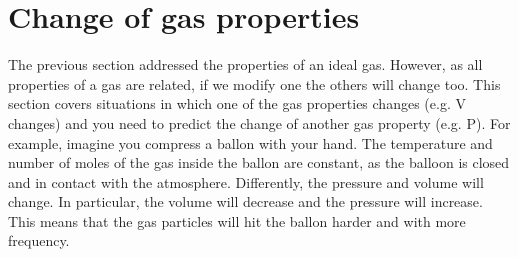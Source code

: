 \documentclass[main.tex]{subfiles}
\begin{document}
\section{Change of gas properties}
The previous section addressed the properties of an ideal gas.  However, as all properties of a gas are related, if we modify one the others will change too. This section covers situations in which one of the gas properties changes (e.g. V changes) and you need to predict the change of another gas property (e.g. P). For example, imagine you compress a ballon with your hand. The temperature and number of moles of the gas inside the ballon are constant, as the balloon is closed and in contact with the atmosphere. Differently, the pressure and volume will change. In particular, the volume will decrease and the pressure will increase. This means that the gas particles will hit the ballon harder and with more frequency.
\sloppy 
\end{document}
